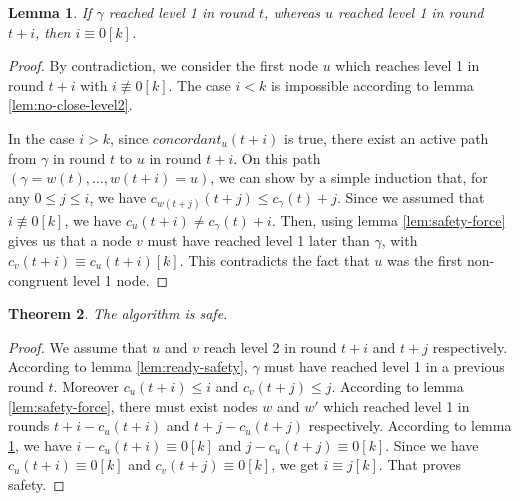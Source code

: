 \documentclass[11pt,letterpaper]{article}
\newtheorem{thm}{Theorem}
\newtheorem{lem}[thm]{Lemma}
\newcommand{\cent}{\gamma}
\begin{document}
\begin{lem} \label{lem:later-level1}
	If $\cent$ reached level 1 in round $t$, whereas $u$ reached level 1 in round $t+i$, then $i \equiv 0 [k]$. 
\end{lem}
\begin{proof}
	By contradiction, we consider the first node $u$ which reaches level 1 in round $t+i$ with $i \not\equiv 0 [k]$.
	The case $i < k$ is impossible according to lemma \ref{lem:no-close-level2}.

	In the case $i > k$, since $concordant_u(t+i)$ is true, there exist an active path from $\cent$ in round $t$ to $u$ in round $t+i$.
	On this path $(\cent = w(t), \dots, w(t+i) = u)$, we can show by a simple induction that, for any $0 \leq j \leq i$, we have $c_{w(t+j)}(t+j) \leq c_\cent(t)+j$.
	Since we assumed that $i \not\equiv 0[k]$, we have $c_u(t+i) \neq c_\cent(t)+i$.
	Then, using lemma \ref{lem:safety-force} gives us that a node $v$ must have reached level 1 later than $\cent$, with $c_v(t+i) \equiv c_u(t+i) [k]$.
	This contradicts the fact that $u$ was the first non-congruent level 1 node.
\end{proof}

\begin{thm} \label{lem:safety} 
	The algorithm is safe.
\end{thm}
\begin{proof}
	We assume that $u$ and $v$ reach level 2 in round $t+i$ and $t+j$ respectively.
	According to lemma \ref{lem:ready-safety}, $\cent$ must have reached level 1 in a previous round $t$.
	Moreover $c_u(t+i) \leq i$ and $c_v(t+j) \leq j$.
	According to lemma \ref{lem:safety-force}, there must exist nodes $w$ and $w'$ which reached level 1 in rounds $t+i-c_u(t+i)$ and $t+j-c_u(t+j)$ respectively.
	According to lemma \ref{lem:later-level1}, we have $i-c_u(t+i) \equiv 0 [k]$ and $j-c_u(t+j) \equiv 0 [k]$. 
	Since we have $c_u(t+i) \equiv 0 [k]$ and $c_v(t+j) \equiv 0 [k]$, we get $i \equiv j [k]$. That proves safety.
\end{proof}
\end{document}
